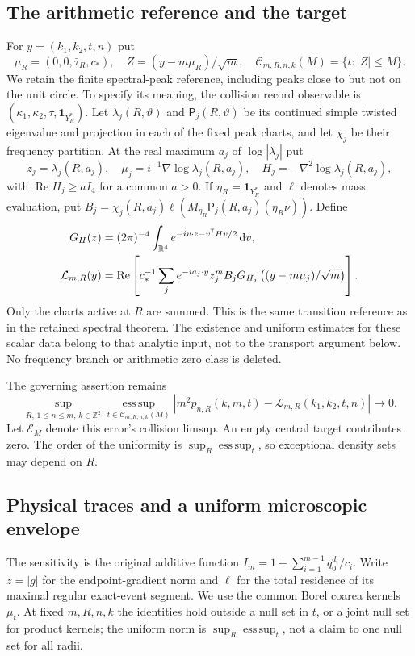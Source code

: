 \documentclass[11pt,reqno]{amsart}
\numberwithin{equation}{section}
\theoremstyle{definition}
\theoremstyle{remark}\newtheorem{remark}[theorem]{Remark}
\newcommand{\R}{\mathbb R}\newcommand{\Z}{\mathbb Z}
\newcommand{\one}{\mathbf1}\newcommand{\dd}{\,\mathrm d}
\newcommand{\esssup}{\operatorname*{ess\,sup}}
\begin{document}
\subsection{The arithmetic reference and the target}
For $y=(k_1,k_2,t,n)$ put
\[
 \mu_R=(0,0,\bar\tau_R,c_*),\quad
 Z=(y-m\mu_R)/\sqrt m,\quad
 \mathcal C_{m,R,n,k}(M)=\{t:|Z|\le M\}.
\]
We retain the finite spectral-peak reference, including peaks close to
but not on the unit circle. To specify its meaning, the collision
record observable is $(\kappa_1,\kappa_2,\tau,\one_{Y_R^*})$.
Let $\lambda_j(R,\vartheta)$ and $\mathsf P_j(R,\vartheta)$ be its
continued simple twisted eigenvalue and projection in each of the
fixed peak charts, and let $\chi_j$ be their frequency partition.
At the real maximum $a_j$ of $\log|\lambda_j|$ put
\[
 z_j=\lambda_j(R,a_j),\quad
 \mu_j=i^{-1}\nabla\log\lambda_j(R,a_j),\quad
 H_j=-\nabla^2\log\lambda_j(R,a_j),
\]
with $\operatorname{Re}H_j\ge aI_4$ for a common $a>0$. If
$\eta_R=\one_{Y_R^*}$ and $\ell$ denotes mass evaluation, put
$B_j=\chi_j(R,a_j)\ell(M_{\eta_R}\mathsf P_j(R,a_j)(\eta_R\nu))$.
Define
\begin{align}
 G_H(z)&=(2\pi)^{-4}\int_{\R^4}e^{-iv\cdot z-v^{\mathsf T}Hv/2}\dd v,
 \notag\\
 \mathcal L_{m,R}(y)&=\operatorname{Re}\left[
 c_*^{-1}\sum_j e^{-ia_j\cdot y}z_j^m B_j
      G_{H_j}\left((y-m\mu_j)/\sqrt m\right)\right].
 \label{eq:v76-reference}
\end{align}
Only the charts active at $R$ are summed. This is the same transition
reference as in the retained spectral theorem. The existence and
uniform estimates for these scalar data belong to that analytic
input, not to the transport argument below. No frequency branch or
arithmetic zero class is deleted.

The governing assertion remains
\begin{equation}\label{eq:v76-target}
 \sup_{R,\,1\le n\le m,\,k\in\Z^2}
 \esssup_{t\in\mathcal C_{m,R,n,k}(M)}
 |m^2p_{n,R}(k,m,t)-\mathcal L_{m,R}(k_1,k_2,t,n)|\longrightarrow0.
\end{equation}
Let $\mathcal E_M$ denote this error's collision limsup. An empty
central target contributes zero. The order of the uniformity is
$\sup_R\esssup_t$, so exceptional density sets may depend on $R$.

\subsection{Physical traces and a uniform microscopic envelope}
The sensitivity is the original additive function
$I_m=1+\sum_{i=1}^{m-1}q_0^{d_i}/c_i$. Write $z=|g|$ for the
endpoint-gradient norm and $\ell$ for the total residence of its
maximal regular exact-event segment. We use the common Borel coarea
kernels $\mu_t$. At fixed $m,R,n,k$ the identities hold outside a
null set in $t$, or a joint null set for product kernels; the uniform
norm is $\sup_R\esssup_t$, not a claim to one null set for all radii.
\end{document}
